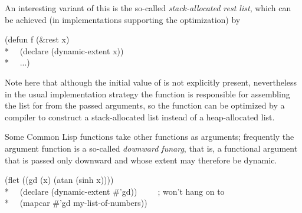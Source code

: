 \begin{flushdesc}
  An interesting variant of this is the so-called \emph{stack-allocated rest
list}, which can be achieved (in implementations supporting the optimization) by
\begin{lisp} (defun f (\&rest x) \\* ~~(declare (dynamic-extent x)) \\* ~~...)
\end{lisp} Note here that although the initial value of  is not
explicitly present, nevertheless in the usual implementation strategy the
function  is responsible for assembling the list for  from the
passed arguments, so the  function can be optimized by a compiler to
construct a stack-allocated list instead of a heap-allocated list.

Some Common Lisp functions take other functions as arguments; frequently the
argument function is a so-called \emph{downward funarg}, that is, a functional
argument that is passed only downward and whose extent may therefore be dynamic.
\begin{lisp} (flet ((gd (x) (atan (sinh x)))) \\* ~~(declare (dynamic-extent
\#'gd))~~~~~;\textrm{ won't hang on to }\\* ~~(mapcar \#'gd
my-list-of-numbers))
\end{lisp}



\end{flushdesc}
